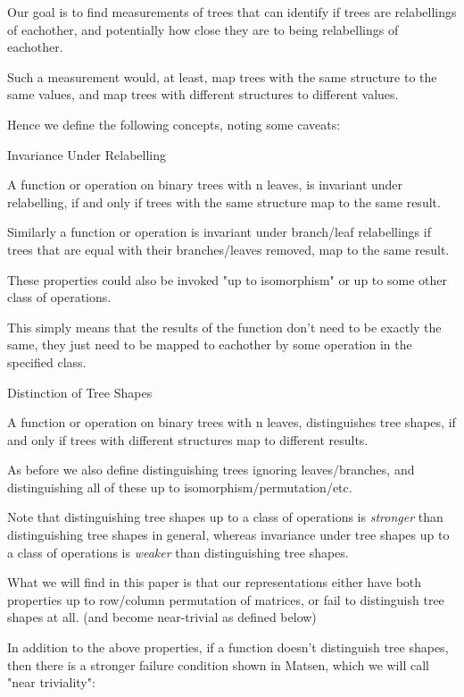 \documentclass{report}
\begin{document}
Our goal is to find measurements of trees that can identify if trees are relabellings of eachother, and potentially how close they are to being relabellings of eachother.

Such a measurement would, at least, map trees with the same structure to the same values, and map trees with different structures to different values.

Hence we define the following concepts, noting some caveats:

\begin{definition} Invariance Under Relabelling

	A function or operation on binary trees with n leaves, is invariant under relabelling, if and only if trees with the same structure map to the same result.

	Similarly a function or operation is invariant under branch/leaf relabellings if trees that are equal with their branches/leaves removed, map to the same result.

	These properties could also be invoked "up to isomorphism" or up to some other class of operations.

	This simply means that the results of the function don't need to be exactly the same, they just need to be mapped to eachother by some operation in the specified class.
\end{definition}

\begin{definition} Distinction of Tree Shapes

	A function or operation on binary trees with n leaves, distinguishes tree shapes, if and only if trees with different structures map to different results.

	As before we also define distinguishing trees ignoring leaves/branches, and distinguishing all of these up to isomorphism/permutation/etc.
\end{definition}

Note that distinguishing tree shapes up to a class of operations is \emph{stronger} than distinguishing tree shapes in general, whereas invariance under tree shapes up to a class of operations is \emph{weaker} than distinguishing tree shapes.

What we will find in this paper is that our representations either have both properties up to row/column permutation of matrices, or fail to distinguish tree shapes at all. (and become near-trivial as defined below)

In addition to the above properties, if a function doesn't distinguish tree shapes, then there is a stronger failure condition shown in Matsen, which we will call "near triviality":
\end{document}
